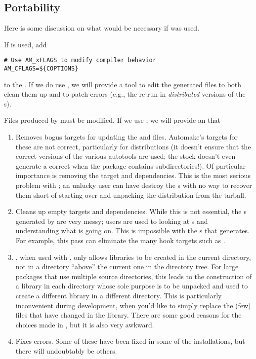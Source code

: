 \documentclass{article}
\begin{document}
\subsection{Portability}
Here is some discussion on what would be necessary if 
was used.

If  is used, add
\begin{verbatim}
# Use AM_xFLAGS to modify compiler behavior
AM_CFLAGS=${COPTIONS}
\end{verbatim}
to the . 
If we do use , we will provide a tool to edit the generated
files to both clean them up and to patch errors (e.g., the re-run
 in \emph{distributed} versions of the s).

Files produced by  must be modified.  If we use
, we will provide an  that 
\begin{enumerate}
\item Removes bogus targets for updating the  and
   files.  Automake's targets for these are not correct,
  particularly for distributions (it doesn't ensure that the correct versions
  of the various autotools are used; the stock  doesn't even
  generate a correct  when the package contains
  subdirectories!).  Of particular importance is
  removing the  target and dependencies.  This is the most 
  serious problem with ; an unlucky user can have
   destroy the s with no way to recover them
  short of starting over and unpacking the distribution from the tarball.

\item Cleans up empty targets and dependencies.  While this is not essential,
  the 
  s generated by  are very messy; users are
  used to looking at s and understanding what is going
  on.  This is impossible with the s that
   generates.
  For
  example, this pass can eliminate the many hook targets such as
  .

\item {}, when used with , only allows libraries to
  be created in the current directory, not in a directory ``above'' the
  current one in the directory tree.  For large packages that use multiple
  source directories, this leads to the construction of a library in each
  directory whose sole purpose is to be unpacked and used to create a
  different library in a different directory.  This is particularly
  inconvenient during development, when you'd like to simply replace the (few)
  files that have changed in the library.  There are some good reasons
  for the choices made in , but it is also very awkward.

\item Fixes errors.  Some of these have been fixed in some of the
   installations, but there will undoubtably be others.
\end{enumerate}
\end{document}
